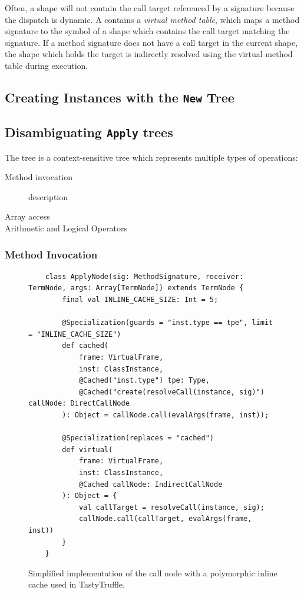 Often, a shape will not contain the call target referenced by a signature because the dispatch is dynamic.
A  contains a \textit{virtual method table}, which maps a method signature to the symbol of a shape which contains the call target matching the signature.
If a method signature does not have a call target in the current shape, the shape which holds the target is indirectly resolved using the virtual method table during execution.

\subsection{Creating Instances with the \texttt{New} Tree}

\subsection{Disambiguating \texttt{Apply} trees}
\label{impl:subsection:apply}
The  tree is a context-sensitive tree which represents multiple types of operations:

\begin{description}
	\item[Method invocation] description
	\item[Array access]
	\item[Arithmetic and Logical Operators]
\end{description}

\subsubsection*{Method Invocation}

\begin{figure}[!htb]
	\begin{verbatim}
	class ApplyNode(sig: MethodSignature, receiver: TermNode, args: Array[TermNode]) extends TermNode {
		final val INLINE_CACHE_SIZE: Int = 5;
		
		@Specialization(guards = "inst.type == tpe", limit = "INLINE_CACHE_SIZE")
		def cached(
			frame: VirtualFrame,
			inst: ClassInstance,
			@Cached("inst.type") tpe: Type,
			@Cached("create(resolveCall(instance, sig)") callNode: DirectCallNode
		): Object = callNode.call(evalArgs(frame, inst));
		
		@Specialization(replaces = "cached")
		def virtual(
			frame: VirtualFrame,
			inst: ClassInstance,
			@Cached callNode: IndirectCallNode
		): Object = {
			val callTarget = resolveCall(instance, sig);
			callNode.call(callTarget, evalArgs(frame, inst))
		}
	}
	\end{verbatim}
	\caption{Simplified implementation of the call node with a polymorphic inline cache used in TastyTruffle.}
	\label{implementation:poly-cache-call-node}
\end{figure}

